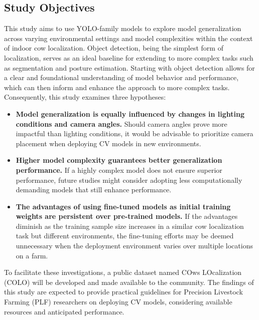 \subsection{Study Objectives}
This study aims to use YOLO-family models to explore model generalization across varying environmental settings and model complexities within the context of indoor cow localization. Object detection, being the simplest form of localization, serves as an ideal baseline for extending to more complex tasks such as segmentation and posture estimation. Starting with object detection allows for a clear and foundational understanding of model behavior and performance, which can then inform and enhance the approach to more complex tasks. Consequently, this study examines three hypotheses:

\begin{itemize}
    \item \textbf{Model generalization is equally influenced by changes in lighting conditions and camera angles.} Should camera angles prove more impactful than lighting conditions, it would be advisable to prioritize camera placement when deploying CV models in new environments.
    \item \textbf{Higher model complexity guarantees better generalization performance.} If a highly complex model does not ensure superior performance, future studies might consider adopting less computationally demanding models that still enhance performance.
    \item \textbf{The advantages of using fine-tuned models as initial training weights are persistent over pre-trained models.} If the advantages diminish as the training sample size increases in a similar cow localization task but different environments, the fine-tuning efforts may be deemed unnecessary when the deployment environment varies over multiple locations on a farm.
\end{itemize}

To facilitate these investigations, a public dataset named COws LOcalization (COLO) \cite{COLODataset2023} will be developed and made available to the community. The findings of this study are expected to provide practical guidelines for Precision Livestock Farming (PLF) researchers on deploying CV models, considering available resources and anticipated performance.